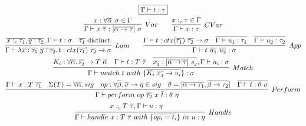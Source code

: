 \documentclass[acmsmall]{acmart}
\newcommand{\mathframebox}[1]{\framebox{$\displaystyle #1$}}
\newcommand{\ap}{~}
\begin{document}
\begin{figure}
    \begin{gather*}
        \mathframebox{\Gamma\vdash t : \tau} \\
        \infer[Var]{\Gamma\vdash x\ap\overline{\tau} : [\overline{\alpha\to\tau}]\ap\sigma}{x : \forall\overline{\alpha}\ldotp \sigma \in \Gamma}
        \text{\hspace{2em}}
        \infer[CVar]{\Gamma\vdash x : \tau}{x :_c \tau \in \Gamma} \\
        \infer[Lam]{
            \Gamma\vdash \lambda \overline{x : \tau_1} ~ \overline{y : \tau_2} \ldotp t : ctx(\overline{\tau_1}) ~ \overline{\tau_2} \to \sigma
        }{
            \overline{x :_c \tau_1}, \overline{y : \tau_2}, \Gamma\vdash t : \sigma &
            \overline{\tau_1} \text{ distinct}
        }
        \text{\hspace{2em}}
        \infer[App]{
            \Gamma\vdash t \ap \overline{u_1} \ap \overline{u_2} : \sigma
        } {
            \Gamma\vdash t : ctx(\overline{\tau_1})~\overline{\tau_2}\to\sigma
            &
            \overline{\Gamma\vdash u_1 : \tau_1}
            &
            \overline{\Gamma\vdash u_2 : \tau_2}
        }\\
        \infer[Match]{
            \Gamma\vdash match ~ t ~with ~\{ \overline{K_i\ap \overline{x_j} \to u_i }\}  : \sigma
        }{
            K_i : \forall \overline{\alpha}\ldotp \overline{s_j} \to T\ap\overline{\alpha} &
            \Gamma\vdash t : T \ap\overline{\tau} &
            \overline{x_j : [\overline{\alpha\to\tau}]\ap s_j}, \Gamma \vdash u_i : \sigma
        }\\
        \infer[Perform]{
            \Gamma\vdash perform \ap op\ap \overline{\tau_2}\ap x\ap \overline{t} : \theta\ap\eta
        }{
            \Gamma\vdash x : T\ap \overline{\tau_1} &
            \Sigma(T) = \forall\overline{\alpha}\ldotp sig &
            op : \forall\overline{\beta}\ldotp \overline{\sigma}\to\eta \in sig &
            \theta = [\overline{\alpha\to\tau_1}, \overline{\beta\to\tau_2}] &
            \overline{\Gamma\vdash t : \theta\ap\sigma}
        }\\
        \infer[Handle]{
            \Gamma \vdash handle ~ x : T\ap\overline{\tau}~ with ~ \{\overline{op_i = t_i}\} ~in~u : \eta
        }{
            \begin{gathered}
                x :_c T\ap\overline{\tau}, \Gamma\vdash u : \eta
            \end{gathered}
            &
}
\end{gather*}
\end{figure}
\end{document}
